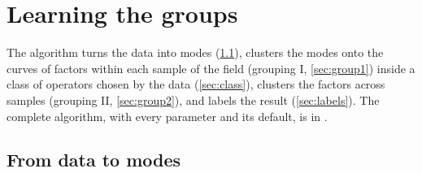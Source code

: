 \section{Learning the groups}\label{sec:algorithm}
The algorithm turns the data into modes (\cref{sec:modes}), clusters the modes onto the curves of factors within each
sample of the field (grouping I, \cref{sec:group1}) inside a class of operators chosen by the data
(\cref{sec:class}), clusters the factors across samples (grouping II, \cref{sec:group2}), and labels the result
(\cref{sec:labels}). The complete algorithm, with every parameter and its default, is in \SMalgo.

\subsection{From data to modes}\label{sec:modes}
